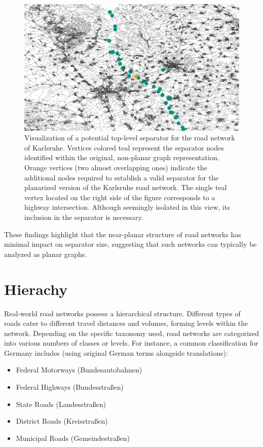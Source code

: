 \begin{figure}[tbhp]
	\centering
	\includegraphics[width=0.8\linewidth]{graphics/karlsruhe_top_level_sep_extended_to_planar_wide.png}
	\caption{Visualization of a potential top-level separator for the road network of Karlsruhe.
		Vertices colored teal represent the separator nodes identified within the original, non-planar graph representation.
		Orange vertices (two almost overlapping ones) indicate the additional nodes required to establish a valid separator for the planarized version of the Karlsruhe road network.
		The single teal vertex located on the right side of the figure corresponds to a highway intersection.
		Although seemingly isolated in this view, its inclusion in the separator is necessary.}
	\label{fig:karlsruhe_planar_vs_non_planar}
\end{figure}

These findings highlight that the near-planar structure of road networks has
minimal impact on separator size, suggesting that such networks can typically
be analyzed as planar graphs.







\section{Hierachy}
\label{sec:hierarchy}

Real-world road networks possess a hierarchical structure.
Different types of roads cater to different travel distances and volumes, forming levels within the network.
Depending on the specific taxonomy used, road networks are categorized into various numbers of classes or levels.
For instance, a common classification for Germany includes (using original German terms alongside translations):

\begin{itemize}
    \item Federal Motorways (Bundesautobahnen)
    \item Federal Highways (Bundesstraßen)
    \item State Roads (Landesstraßen)
    \item District Roads (Kreisstraßen)
    \item Municipal Roads (Gemeindestraßen)
\end{itemize}










